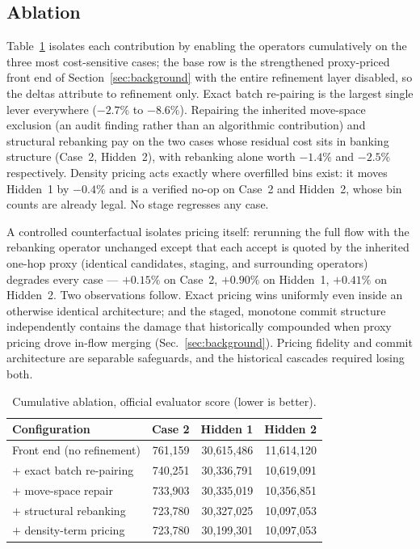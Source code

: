 \subsection{Ablation}\label{sec:ablation}

Table~\ref{tab:ablation} isolates each contribution by enabling the operators cumulatively on the three most cost-sensitive cases; the base row is the strengthened proxy-priced front end of Section~\ref{sec:background} with the entire refinement layer disabled, so the deltas attribute to refinement only. Exact batch re-pairing is the largest single lever everywhere ($-2.7\%$ to $-8.6\%$). Repairing the inherited move-space exclusion (an audit finding rather than an algorithmic contribution) and structural rebanking pay on the two cases whose residual cost sits in banking structure (Case~2, Hidden~2), with rebanking alone worth $-1.4\%$ and $-2.5\%$ respectively. Density pricing acts exactly where overfilled bins exist: it moves Hidden~1 by $-0.4\%$ and is a verified no-op on Case~2 and Hidden~2, whose bin counts are already legal. No stage regresses any case.

A controlled counterfactual isolates pricing itself: rerunning the full flow with the rebanking operator unchanged except that each accept is quoted by the inherited one-hop proxy (identical candidates, staging, and surrounding operators) degrades every case --- $+0.15\%$ on Case~2, $+0.90\%$ on Hidden~1, $+0.41\%$ on Hidden~2. Two observations follow. Exact pricing wins uniformly even inside an otherwise identical architecture; and the staged, monotone commit structure independently contains the damage that historically compounded when proxy pricing drove in-flow merging (Sec.~\ref{sec:background}). Pricing fidelity and commit architecture are separable safeguards, and the historical cascades required losing both.

\begin{table}[t]
\centering
\caption{Cumulative ablation, official evaluator score (lower is better).}
\label{tab:ablation}
\small
\begin{tabular}{@{}lrrr@{}}
\toprule
Configuration & Case 2 & Hidden 1 & Hidden 2 \\
\midrule
Front end (no refinement)       & 761{,}159 & 30{,}615{,}486 & 11{,}614{,}120 \\
$+$ exact batch re-pairing      & 740{,}251 & 30{,}336{,}791 & 10{,}619{,}091 \\
$+$ move-space repair           & 733{,}903 & 30{,}335{,}019 & 10{,}356{,}851 \\
$+$ structural rebanking        & 723{,}780 & 30{,}327{,}025 & 10{,}097{,}053 \\
$+$ density-term pricing        & 723{,}780 & 30{,}199{,}301 & 10{,}097{,}053 \\
\bottomrule
\end{tabular}
\end{table}

